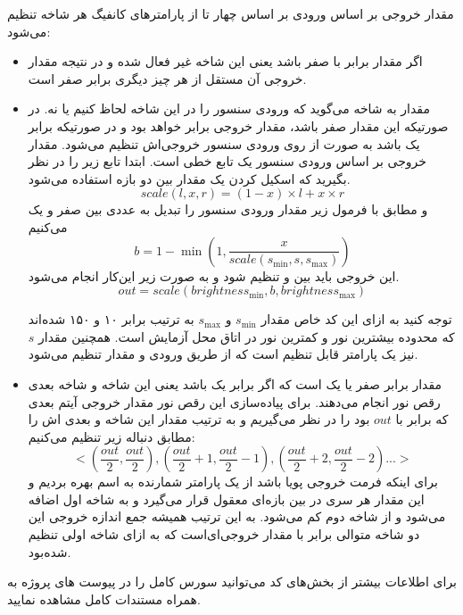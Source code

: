 مقدار خروجی بر اساس ورودی بر اساس چهار تا از پارامتر‌های کانفیگ هر شاخه تنظیم می‌شود:
\begin{itemize}
	\item 
	اگر مقدار
	برابر با صفر باشد یعنی این شاخه غیر فعال شده و در نتیجه مقدار خروجی‌ آن مستقل از هر چیز دیگری برابر صفر است.
	
	\item 
	مقدار
	به شاخه می‌گوید که ورودی سنسور را در این شاخه لحاظ کنیم یا نه. در صورتیکه این مقدار صفر باشد، مقدار خروجی برابر
	خواهد بود و در صورتیکه برابر یک باشد به صورت 
	از روی ورودی سنسور خروجی‌اش تنظیم می‌شود. مقدار خروجی بر اساس ورودی سنسور یک تابع خطی است. ابتدا تابع زیر را در نظر بگیرید که اسکیل کردن یک مقدار
	بین دو بازه استفاده می‌شود.
	$$scale(l, x, r) = (1 - x) \times l + x \times r$$
	 و مطابق با فرمول زیر مقدار ورودی سنسور را تبدیل به عددی بین صفر و یک می‌کنیم
	$$b = 1 - \min(1, \frac{x}{scale(s_{\min} , s , s_{\max})})$$
	این خروجی باید بین 
	و
	تنظیم شود و به صورت زیر این‌کار انجام می‌شود.
	$$out = scale(brightness_{\min}, b, brightness_{\max})$$
	
	توجه کنید به ازای این کد خاص مقدار
	$s_{\min}$
	و
	$s_{\max}$
	به ترتیب برابر ۱۰ و ۱۵۰ شده‌اند که محدوده بیشترین نور و کمترین نور در اتاق محل آزمایش است. همچنین مقدار
	$s$
	نیز یک پارامتر قابل تنظیم است که از طریق ورودی 
	و مقدار
	تنظیم می‌شود.
	\item
	مقدار 
	برابر صفر یا یک است که اگر برابر یک باشد یعنی این شاخه و شاخه بعدی رقص نور انجام می‌دهند. برای پیاده‌سازی این رقص نور مقدار خروجی آیتم بعدی که برابر با
	$out$
	بود را در نظر می‌گیریم و به ترتیب مقدار این شاخه و بعدی اش را مطابق دنباله زیر تنظیم می‌کنیم:
	$$<(\frac{out}{2}, \frac{out}{2}), (\frac{out}{2} + 1, \frac{out}{2} - 1), (\frac{out}{2} + 2, \frac{out}{2} - 2) ... >$$
	برای اینکه فرمت خروجی پویا باشد از یک پارامتر شمارنده به اسم
	بهره بردیم و این مقدار هر سری در بین بازه‌ای معقول قرار می‌گیرد و به شاخه اول اضافه می‌شود و از شاخه دوم کم می‌شود. به این ترتیب همیشه جمع اندازه خروجی این دو شاخه متوالی برابر با مقدار خروجی‌ای‌است که به ازای شاخه اولی تنظیم شده‌بود.
\end{itemize}

برای اطلاعات بیشتر از بخش‌های کد می‌توانید سورس کامل را در پیوست های پروژه به همراه مستندات کامل مشاهده نمایید.

